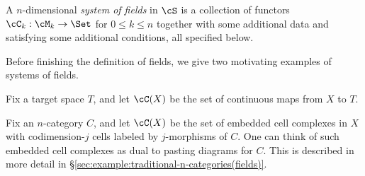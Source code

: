 A $n$-dimensional {\it system of fields} in $\cS$
is a collection of functors $\cC_k : \cM_k \to \Set$ for $0 \leq k \leq n$
together with some additional data and satisfying some additional conditions, all specified below.

Before finishing the definition of fields, we give two motivating examples of systems of fields.

\begin{example}
\label{ex:maps-to-a-space(fields)}
Fix a target space $T$, and let $\cC(X)$ be the set of continuous maps
from $X$ to $T$.
\end{example}

\begin{example}
\label{ex:traditional-n-categories(fields)}
Fix an $n$-category $C$, and let $\cC(X)$ be 
the set of embedded cell complexes in $X$ with codimension-$j$ cells labeled by
$j$-morphisms of $C$.
One can think of such embedded cell complexes as dual to pasting diagrams for $C$.
This is described in more detail in \S \ref{sec:example:traditional-n-categories(fields)}.
\end{example}

